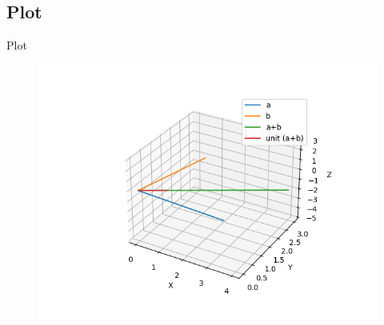 \documentclass{beamer}
\theoremstyle{remark}
\numberwithin{equation}{section}
\begin{document}
\subsection{Plot}
\begin{frame}{Plot}
 \begin{figure}[H]
    \centering
    \includegraphics[width=\columnwidth]{../figs/plot.png}
    \caption*{}
    \label{fig:plot_c}
\end{figure}
\end{frame}
\end{document}
